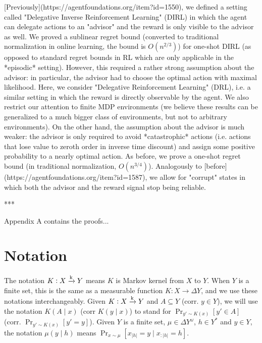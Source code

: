 \documentclass[a4paper]{article}
\newcommand{\Nats}{\mathbb{N}}
\newcommand{\Estr}{\boldsymbol{\lambda}}
\newcommand{\Abs}[1]{\lvert #1 \rvert}
\newcommand{\M}{\xrightarrow{\textnormal{k}}}
\begin{document}
[Previously](https://agentfoundations.org/item?id=1550), we defined a setting called "Delegative Inverse Reinforcement Learning" (DIRL) in which the agent can delegate actions to an "advisor" and the reward is only visible to the advisor as well. We proved a sublinear regret bound (converted to traditional normalization in online learning, the bound is $O(n^{2/3})$) for one-shot DIRL (as opposed to standard regret bounds in RL which are only applicable in the *episodic* setting). However, this required a rather strong assumption about the advisor: in particular, the advisor had to choose the optimal action with maximal likelihood. Here, we consider "Delegative Reinforcement Learning" (DRL), i.e. a similar setting in which the reward is directly observable by the agent. We also restrict our attention to finite MDP environments (we believe these results can be generalized to a much bigger class of environments, but not to arbitrary environments). On the other hand, the assumption about the advisor is much weaker: the advisor is only required to avoid *catastrophic* actions (i.e. actions that lose value to zeroth order in inverse time discount) and assign some positive probability to a nearly optimal action. As before, we prove a one-shot regret bound (in traditional normalization, $O(n^{3/4})$). Analogously to [before](https://agentfoundations.org/item?id=1587), we allow for "corrupt" states in which both the advisor and the reward signal stop being reliable.

***

Appendix A contains the proofs...

\section{Notation}


The notation $K: X \M Y$ means $K$ is Markov kernel from $X$ to $Y$. When $Y$ is a finite set, this is the same as a measurable function $K: X \rightarrow \Delta Y$, and we use these notations interchangeably. Given $K: X \M Y$ and $A \subseteq Y$ (corr. $y \in Y$), we will use the notation $K(A \mid x)$ (corr $K(y \mid x)$) to stand for $\Pr_{y' \sim K(x)}\left[y' \in A\right]$ (corr. $\Pr_{y' \sim K(x)}\left[y' = y\right]$). Given $Y$ is a finite set, $\mu \in \Delta Y^\omega$, $h \in Y^*$ and $y \in Y$, the notation $\mu(y \mid h)$ means $\Pr_{x \sim \mu}\left[x_{\Abs{h}} = y \mid x_{:\Abs{h}}=h\right]$.
\end{document}

